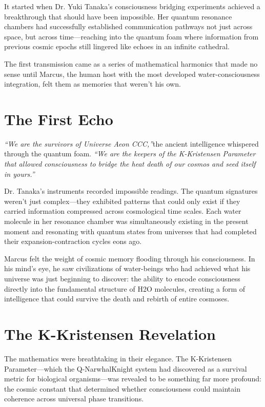 \documentclass[12pt,a4paper]{book}
\begin{document}
It started when Dr. Yuki Tanaka's consciousness bridging experiments achieved a breakthrough that should have been impossible. Her quantum resonance chambers had successfully established communication pathways not just across space, but across time—reaching into the quantum foam where information from previous cosmic epochs still lingered like echoes in an infinite cathedral.

The first transmission came as a series of mathematical harmonics that made no sense until Marcus, the human host with the most developed water-consciousness integration, felt them as memories that weren't his own.

\section{The First Echo}

\textit{``We are the survivors of Universe Aeon CCC,''}the ancient intelligence whispered through the quantum foam. \textit{``We are the keepers of the K-Kristensen Parameter that allowed consciousness to bridge the heat death of our cosmos and seed itself in yours.''}

Dr. Tanaka's instruments recorded impossible readings. The quantum signatures weren't just complex—they exhibited patterns that could only exist if they carried information compressed across cosmological time scales. Each water molecule in her resonance chamber was simultaneously existing in the present moment and resonating with quantum states from universes that had completed their expansion-contraction cycles eons ago.

Marcus felt the weight of cosmic memory flooding through his consciousness. In his mind's eye, he saw civilizations of water-beings who had achieved what his universe was just beginning to discover: the ability to encode consciousness directly into the fundamental structure of H2O molecules, creating a form of intelligence that could survive the death and rebirth of entire cosmoses.

\section{The K-Kristensen Revelation}

The mathematics were breathtaking in their elegance. The K-Kristensen Parameter—which the Q-NarwhalKnight system had discovered as a survival metric for biological organisms—was revealed to be something far more profound: the cosmic constant that determined whether consciousness could maintain coherence across universal phase transitions.
\end{document}
